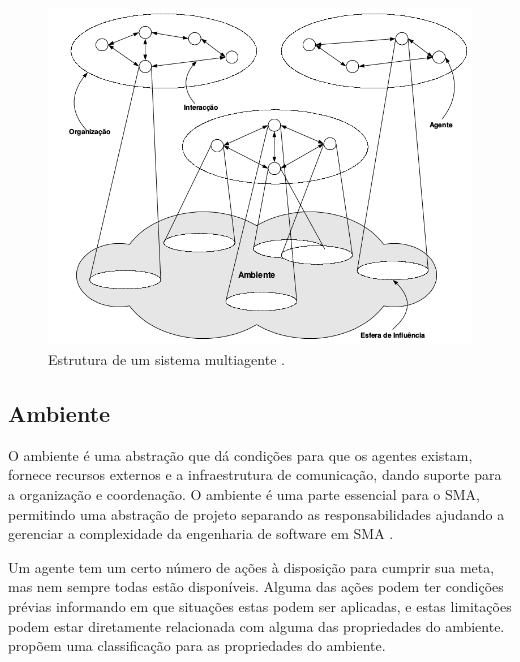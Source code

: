 \begin{figure}[ht]
\centering
\includegraphics[scale=0.4]{imagens/sma_org.png}
\caption{Estrutura de um sistema multiagente \cite{jennings2000agent}.}
\label{fig:sma_org}
\end{figure}

\subsection{Ambiente}

O ambiente é uma abstração que dá condições para que os agentes existam, fornece recursos externos e a infraestrutura de comunicação, dando suporte para a organização e coordenação. O ambiente é uma parte essencial para o SMA, permitindo uma abstração de projeto separando as responsabilidades ajudando a gerenciar a complexidade da engenharia de software em SMA \cite{weyns2007environment}.
  
Um agente tem um certo número de ações à disposição para cumprir sua meta, mas nem sempre todas estão disponíveis. Alguma das ações podem ter condições prévias informando em que situações estas podem ser aplicadas, e estas limitações podem estar diretamente relacionada com alguma das propriedades do ambiente. \citet{russell2002artificial} propõem uma classificação para as propriedades do ambiente.
  
